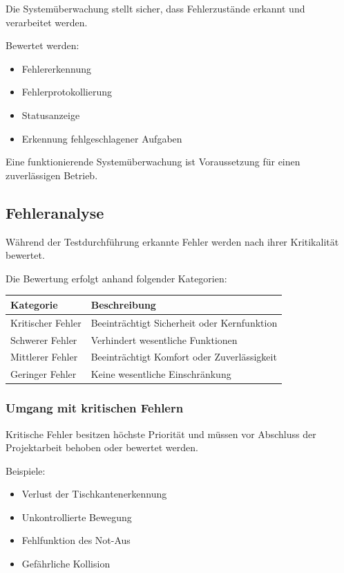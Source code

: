 Die Systemüberwachung stellt sicher, dass Fehlerzustände erkannt und
verarbeitet werden.

Bewertet werden:

\begin{itemize}
\tightlist
\item
  Fehlererkennung
\item
  Fehlerprotokollierung
\item
  Statusanzeige
\item
  Erkennung fehlgeschlagener Aufgaben
\end{itemize}

Eine funktionierende Systemüberwachung ist Voraussetzung für einen
zuverlässigen Betrieb.

\subsection{Fehleranalyse}\label{fehleranalyse}

Während der Testdurchführung erkannte Fehler werden nach ihrer
Kritikalität bewertet.

Die Bewertung erfolgt anhand folgender Kategorien:

\begin{longtable}[]{@{}ll@{}}
\toprule\noalign{}
Kategorie & Beschreibung \\
\midrule\noalign{}
\endhead
\bottomrule\noalign{}
\endlastfoot
Kritischer Fehler & Beeinträchtigt Sicherheit oder Kernfunktion \\
Schwerer Fehler & Verhindert wesentliche Funktionen \\
Mittlerer Fehler & Beeinträchtigt Komfort oder Zuverlässigkeit \\
Geringer Fehler & Keine wesentliche Einschränkung \\
\end{longtable}

\subsubsection{Umgang mit kritischen
Fehlern}\label{umgang-mit-kritischen-fehlern}

Kritische Fehler besitzen höchste Priorität und müssen vor Abschluss der
Projektarbeit behoben oder bewertet werden.

Beispiele:

\begin{itemize}
\tightlist
\item
  Verlust der Tischkantenerkennung
\item
  Unkontrollierte Bewegung
\item
  Fehlfunktion des Not-Aus
\item
  Gefährliche Kollision
\end{itemize}

